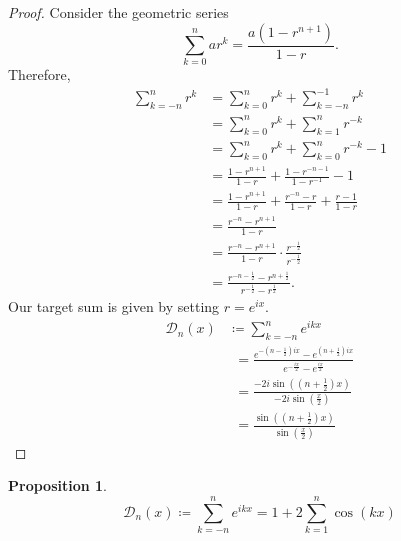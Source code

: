 \documentclass[a4paper]{article}
\newtheorem{proposition}[theorem]{Proposition}
\theoremstyle{definition}
\begin{document}
\begin{proof}
    Consider the geometric series
    \begin{equation*}
        \sum_{k = 0}^{n} ar^k = \frac{a(1 - r^{n+1})}{1 - r}.
    \end{equation*}
    Therefore,
    \begin{align*}
        \sum_{k=-n}^{n} r^k & = \sum_{k=0}^{n} r^k + \sum_{k=-n}^{-1} r^k                                        \\
                            & = \sum_{k=0}^{n} r^k + \sum_{k=1}^{n} r^{-k}                                       \\
                            & = \sum_{k=0}^{n} r^k + \sum_{k=0}^{n} r^{-k} - 1                                   \\
                            & = \frac{1 - r^{n+1}}{1 - r} + \frac{1 - r^{-n - 1}}{1 - r^{-1}} - 1                \\
                            & = \frac{1 - r^{n+1}}{1 - r} + \frac{r^{-n} - r}{1 - r} + \frac{r-1}{1-r}           \\
                            & = \frac{r^{-n} - r^{n+1}}{1-r}                                                     \\
                            & = \frac{r^{-n} - r^{n+1}}{1-r} \cdot \frac{r^{-\frac{1}{2}}}{r^{-\frac{1}{2}}}     \\
                            & = \frac{r^{-n-\frac{1}{2}} - r^{n+\frac{1}{2}}}{r^{-\frac{1}{2}}-r^{\frac{1}{2}}}.
    \end{align*}
    Our target sum is given by setting $r = e^{ix}$.
    \begin{align*}
        \mathcal{D}_n(x) & \coloneq \sum_{k = -n}^{n} e^{ikx}                                                                                           \\
                         & \phantom{:}= \frac{e^{-\left(n-\frac{1}{2}\right)ix} - e^{\left(n+\frac{1}{2}\right)ix}}{e^{-\frac{ix}{2}}-e^{\frac{ix}{2}}} \\
                         & \phantom{:}= \frac{-2i\sin\left(\left(n + \frac{1}{2}\right)x\right)}{-2i\sin\left(\frac{x}{2}\right)}                       \\
                         & \phantom{:}= \frac{\sin\left(\left(n + \frac{1}{2}\right)x\right)}{\sin\left(\frac{x}{2}\right)}
    \end{align*}
\end{proof}
\begin{proposition} \label{thm:Dirichlet kernel proposition 2}
    \begin{equation*}
        \mathcal{D}_n(x) \coloneq \sum_{k = -n}^{n} e^{ikx} = 1 + 2\sum_{k=1}^{n} \cos(kx)
    \end{equation*}
\end{proposition}
\end{document}
